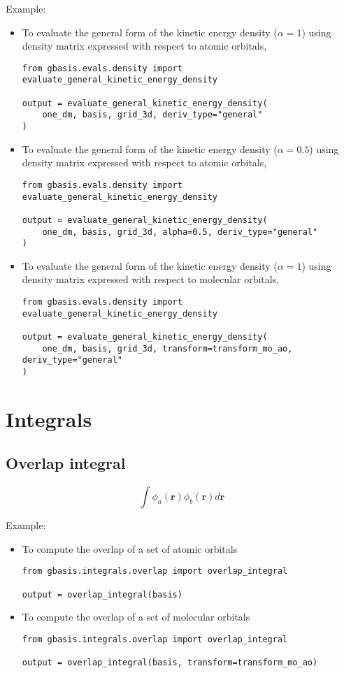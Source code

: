 \documentclass[letterpaper]{article}
\begin{document}
Example:
\begin{itemize}
\item To evaluate the general form of the kinetic energy density ($\alpha=1$)
  using density matrix expressed with respect to atomic orbitals,
  \begin{lstlisting}[xleftmargin=-25pt]
from gbasis.evals.density import evaluate_general_kinetic_energy_density

output = evaluate_general_kinetic_energy_density(
	one_dm, basis, grid_3d, deriv_type="general"
)
\end{lstlisting}
\item To evaluate the general form of the kinetic energy density ($\alpha=0.5$)
  using density matrix expressed with respect to atomic orbitals,
  \begin{lstlisting}[xleftmargin=-25pt]
from gbasis.evals.density import evaluate_general_kinetic_energy_density

output = evaluate_general_kinetic_energy_density(
	one_dm, basis, grid_3d, alpha=0.5, deriv_type="general"
)
\end{lstlisting}
\item To evaluate the general form of the kinetic energy density ($\alpha=1$)
  using density matrix expressed with respect to molecular orbitals,
  \begin{lstlisting}[xleftmargin=-25pt]
from gbasis.evals.density import evaluate_general_kinetic_energy_density

output = evaluate_general_kinetic_energy_density(
    one_dm, basis, grid_3d, transform=transform_mo_ao, deriv_type="general"
)
\end{lstlisting}
\end{itemize}
\section{Integrals}

\subsection{Overlap integral}
\begin{equation}
  \label{eq:overlap}
  \int \phi_a (\mathbf{r}) \phi_b (\mathbf{r}) d\mathbf{r}
\end{equation}

Example:
\begin{itemize}
\item To compute the overlap of a set of atomic orbitals
  \begin{lstlisting}[xleftmargin=-25pt]
from gbasis.integrals.overlap import overlap_integral

output = overlap_integral(basis)
\end{lstlisting}
\item To compute the overlap of a set of molecular orbitals
  \begin{lstlisting}[xleftmargin=-25pt]
from gbasis.integrals.overlap import overlap_integral

output = overlap_integral(basis, transform=transform_mo_ao)
\end{lstlisting}
\end{itemize}
\end{document}
